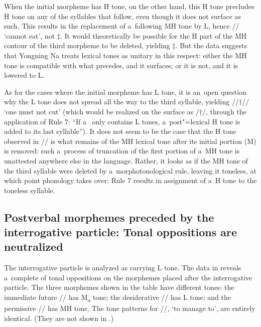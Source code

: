 When the initial morpheme has H tone, on the other hand, this H tone
precludes H tone on any of the syllables that follow, even though it does not surface as such. This results in the replacement
of a~following MH tone by L, hence // ‘cannot eat’, not $\ddagger${\kern2pt}. It would theoretically be possible for the H part of the MH
contour of the third morpheme to be deleted, yielding $\ddagger${\kern2pt}. But the data suggests that Yongning Na treats lexical tones
as {unitary} in this respect: either the MH tone is compatible with what precedes, and it surfaces; or
it is not, and it is lowered to L. 

As for the cases where the initial morpheme has L tone, it is an~open
question why the L tone does not spread all the way to the third syllable, yielding
//$\dagger$// ‘one must not cut’ (which would be realized on the surface as
/$\dagger$/, through the application of Rule 7: “If a~ only contains L tones,
a~post"=lexical H tone is added to its last syllable”). It does not seem to be the case that the H
tone observed in // is what remains of the MH lexical tone after its initial
portion (M) is removed: such a~process of truncation of the first portion of a~MH tone is unattested anywhere else in the language. Rather, it looks
as if the MH tone of the third syllable were deleted by a~morphotonological rule, leaving it toneless, at which point phonology takes over: Rule 7 results in
assignment of a~H tone to the toneless syllable.


\subsection[Postverbal morphemes preceded by the interrogative]{Postverbal morphemes preceded by the interrogative particle: Tonal oppositions are neutralized}
\label{sec:theneutralizationoftonaloppositionsonmorphemesfollowingtheinterrogativeparticle}


The interrogative particle is analyzed as carrying L tone. The data in  reveals a~complete
 of tonal oppositions on the morphemes placed after the interrogative particle. The
three morphemes shown in the table have different tones: the {immediate future} // has M\textsubscript{a} tone; the {desiderative} \mbox{//} has L
tone; and the {permissive} // has MH tone. The tone patterns for //, ‘to manage to’, are entirely identical. (They are not shown in .)

